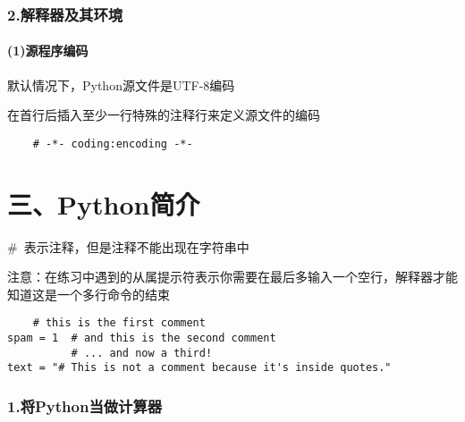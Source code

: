 \documentclass{article}
\begin{document}
\begin{CJK}{UTF8}{gbsn}
\section*{2.解释器及其环境}
\subsection*{(1)源程序编码}
\subparagraph*{}
默认情况下，Python源文件是UTF-8编码
\subparagraph*{}
在首行后插入至少一行特殊的注释行来定义源文件的编码
\begin{verbatim}
    # -*- coding:encoding -*-
\end{verbatim}
\part*{三、Python简介}
\subparagraph*{}
\#\ 表示注释，但是注释不能出现在字符串中
\subparagraph*{}
注意：在练习中遇到的从属提示符表示你需要在最后多输入一个空行，解释器才能知道这是一个多行命令的结束
\begin{verbatim}
    # this is the first comment
spam = 1  # and this is the second comment
          # ... and now a third!
text = "# This is not a comment because it's inside quotes."
\end{verbatim}
\section*{1.将Python当做计算器}

\end{CJK}
\end{document}
